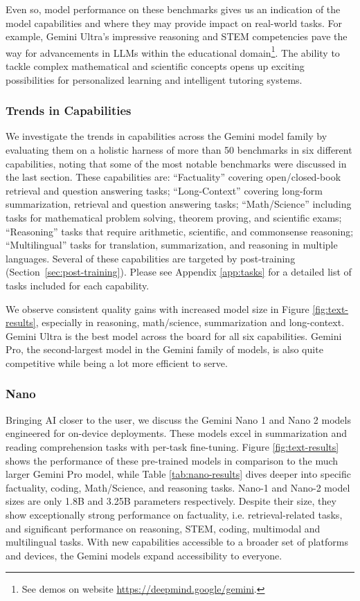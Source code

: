 Even so, model performance on these benchmarks gives us an indication of the model capabilities and where they may provide impact on real-world tasks. For example, Gemini Ultra's impressive reasoning and STEM competencies pave the way for advancements in LLMs within the educational domain\footnote{See demos on website \url{https://deepmind.google/gemini}.}. The ability to tackle complex mathematical and scientific concepts opens up exciting possibilities for personalized learning and intelligent tutoring systems.

\subsubsection{Trends in Capabilities}
\label{sec:capabilities}
We investigate the trends in capabilities across the Gemini model family by evaluating them on a holistic harness of more than 50 benchmarks in six different capabilities, noting that some of the most notable benchmarks were discussed in the last section. These capabilities are: ``Factuality'' covering open/closed-book retrieval and question answering tasks; ``Long-Context'' covering long-form summarization, retrieval and question answering tasks; ``Math/Science'' including tasks for mathematical problem solving, theorem proving, and scientific exams; ``Reasoning'' tasks that require arithmetic, scientific, and commonsense reasoning; ``Multilingual'' tasks for translation, summarization, and reasoning in multiple languages. Several of these capabilities are targeted by post-training (Section~\ref{sec:post-training}). Please see Appendix \ref{app:tasks} for a detailed list of tasks included for each capability.

We observe consistent quality gains with increased model size in Figure \ref{fig:text-results}, especially in reasoning, math/science, summarization and long-context. Gemini Ultra is the best model across the board for all six capabilities. Gemini Pro, the second-largest model in the Gemini family of models, is also quite competitive while being a lot more efficient to serve.

\subsubsection{Nano}
\label{sec:nano}
Bringing AI closer to the user, we discuss the Gemini Nano 1 and Nano 2 models engineered for on-device deployments. These models excel in summarization and reading comprehension tasks with per-task fine-tuning. Figure \ref{fig:text-results} shows the performance of these pre-trained models in comparison to the much larger Gemini Pro model, while Table \ref{tab:nano-results} dives deeper into specific factuality, coding, Math/Science, and reasoning tasks. Nano-1 and Nano-2 model sizes are only 1.8B and 3.25B parameters respectively. Despite their size, they show exceptionally strong performance on factuality, i.e. retrieval-related tasks, and significant performance on reasoning, STEM, coding, multimodal and multilingual tasks. With new capabilities accessible to a broader set of platforms and devices, the Gemini models expand accessibility to everyone.

